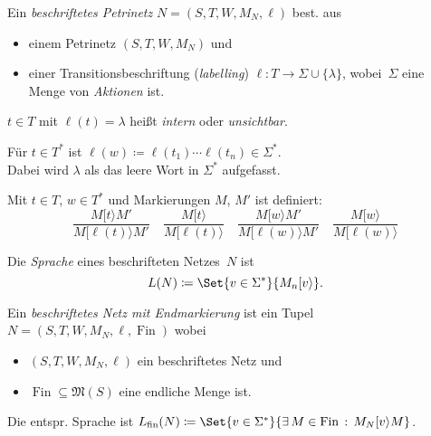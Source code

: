 \documentclass{cheat-sheet}
\newcommand{\activeTransition}[1]{[{#1}\rangle} %
\newcommand{\inferrule}[2]{\frac{{#1}}{{#2}}} %
\newcommand{\Markings}{\mathfrak{M}} %
\DeclareMathOperator{\Fin}{Fin} %
\newcommand{\fin}{\mathrm{fin}} %
\begin{document}
\begin{defn}
  Ein \emph{beschriftetes Petrinetz} $N = (S, T, W, M_N, \ell)$ best. aus
  \begin{itemize}
    \item einem Petrinetz $(S, T, W, M_N)$ und
    \item einer Transitionsbeschriftung (\textit{labelling}) $\ell : T \to \Sigma \cup \{ \lambda \}$, wobei~$\Sigma$ eine Menge von \textit{Aktionen} ist.
  \end{itemize}
\end{defn}

\begin{sprechweise}
  $t \in T$ mit $\ell(t) = \lambda$ heißt \textit{intern} oder \textit{unsichtbar}.
\end{sprechweise}

\begin{nota}
  \begin{minipage}[t]{0.8 \linewidth}
    Für $t \in T^{*}$ ist $\ell(w) \coloneqq \ell(t_1) \cdots \ell(t_n) \in \Sigma^{*}$. \\
    Dabei wird $\lambda$ als das leere Wort in $\Sigma^{*}$ aufgefasst.
  \end{minipage}
\end{nota}

\begin{defn}
  Mit $t \in T$, $w \in T^{*}$ und Markierungen $M$, $M'$ ist definiert:
  \[
    \inferrule
      {M \activeTransition{t} M'}
      {M \activeTransition{\ell(t)} M'} \quad
    \inferrule
      {M \activeTransition{t}}
      {M \activeTransition{\ell(t)}} \quad
    \inferrule
      {M \activeTransition{w} M'}
      {M \activeTransition{\ell(w)} M'} \quad
    \inferrule
      {M \activeTransition{w}}
      {M \activeTransition{\ell(w)}}
  \]
\end{defn}

\begin{defn}
  Die \emph{Sprache} eines beschrifteten Netzes~$N$ ist
  \[
    L(N) \coloneqq \Set{v \in \Sigma^{*}}{M_n \activeTransition{v}}.
  \]
\end{defn}

\begin{defn}
  Ein \emph{beschriftetes Netz mit Endmarkierung} ist ein Tupel $N = (S, T, W, M_N, \ell, \Fin)$ wobei
  \begin{itemize}
    \item $(S, T, W, M_N, \ell)$ ein beschriftetes Netz und
    \item $\Fin \subseteq \Markings(S)$ eine endliche Menge ist.
  \end{itemize}
  Die entspr. Sprache ist $L_\fin(N) \coloneqq \Set{v \in \Sigma^{*}}{\ex{M \in \Fin} M_N \activeTransition{v} M}$.
\end{defn}
\end{document}
